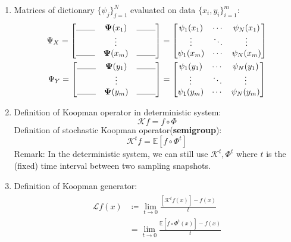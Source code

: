 \documentclass{article}[11]
\begin{document}
\begin{enumerate}
		\item Matrices of dictionary $\{\psi_j\}_{j=1}^N$ evaluated on data $\{x_i, y_i\}_{i=1}^m$:
		\begin{gather*}
			\Psi_X = \begin{bmatrix}
				\rule{0.8cm}{0.1mm} & \mathbf{\Psi}(x_1) & \rule{0.8cm}{0.1mm} \\
				& \vdots &   \\
				\rule{0.8cm}{0.1mm} & \mathbf{\Psi}(x_m) & \rule{0.8cm}{0.1mm}
			\end{bmatrix}
			=\begin{bmatrix}
				\psi_1(x_1) & \cdots & \psi_{N}(x_1) \\
				\vdots & \ddots & \vdots \\
				\psi_1(x_m) & \cdots & \psi_{N}(x_m)
			\end{bmatrix} \\
			\Psi_Y = \begin{bmatrix}
				\rule{0.8cm}{0.1mm} & \mathbf{\Psi}(y_1) & \rule{0.8cm}{0.1mm} \\
				& \vdots &   \\
				\rule{0.8cm}{0.1mm} & \mathbf{\Psi}(y_m) & \rule{0.8cm}{0.1mm}
			\end{bmatrix}
			= \begin{bmatrix}
				\psi_1(y_1) & \cdots & \psi_{N}(y_1) \\
				\vdots & \ddots & \vdots \\
				\psi_1(y_m) & \cdots & \psi_{N}(y_m)
			\end{bmatrix}
		\end{gather*}
		
		\item Definition of Koopman operator in deterministic system:
		$$\mathcal{K}f = f\circ\Phi$$
		Definition of stochastic Koopman operator(\textbf{semigroup}):
		$$\mathcal{K}^{t}f = \mathbb{E}[f\circ\Phi^{t}]$$
		Remark: In the deterministic system, we can still use $\mathcal{K}^t,\Phi^t$ where $t$ is the (fixed) time interval between two sampling snapshots.
		\item Definition of Koopman generator:
		\begin{gather}\label{def_generator}
			\begin{aligned}
				\mathcal{L}f(x) &\coloneqq \lim_{t \to 0} \frac{[\mathcal{K}^{t}f(x)] - f(x)}{t} \\
				&= \lim_{t \to 0} \frac{\mathbb{E}[f\circ\Phi^{t}(x)] - f(x)}{t}
			\end{aligned}
		\end{gather}
		
	\end{enumerate}
	
\end{document}
